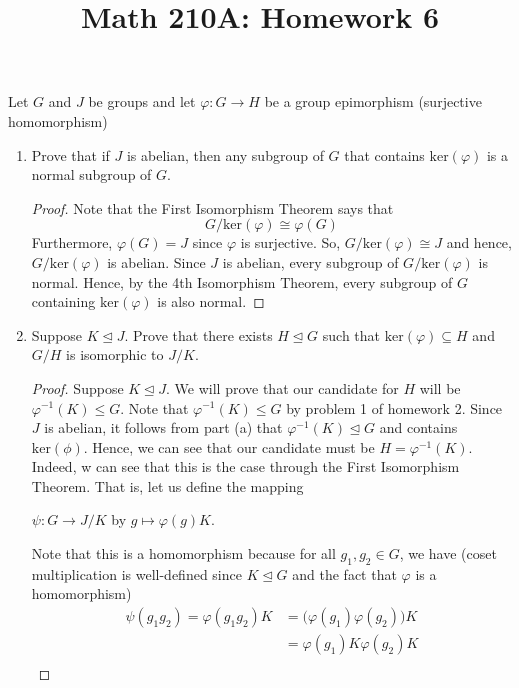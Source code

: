 \documentclass[a4paper]{article}
\title{Math 210A: Homework 6}
\begin{document}
\begin{problem}
    Let \( G  \) and \( J  \) be groups and let \( \varphi : G \to H  \) be a group epimorphism (surjective homomorphism)     
    \begin{enumerate}
        \item[(a)] Prove that if \( J  \) is abelian, then any subgroup of \( G  \) that contains \( \text{ker}(\varphi) \) is a normal subgroup of \( G  \).
            \begin{proof}
Note that the First Isomorphism Theorem says that 
   \[  G / \text{ker}(\varphi)  \cong \varphi(G) \]
   Furthermore, \( \varphi(G) = J  \) since \( \varphi  \) is surjective. So, \( G / \text{ker}(\varphi) \cong J  \) and hence, \( G / \text{ker}(\varphi) \) is abelian. Since \( J  \) is abelian, every subgroup of \( G / \text{ker}(\varphi) \) is normal. Hence, by the 4th Isomorphism Theorem, every subgroup of \( G  \) containing \( \text{ker}(\varphi) \) is also normal.
            \end{proof}
        \item[(b)] Suppose \( K \trianglelefteq J  \). Prove that there exists \( H \trianglelefteq G  \) such that \( \text{ker}(\varphi) \subseteq  H  \) and \( G / H  \) is isomorphic to \( J / K  \).
            \begin{proof}
            Suppose \( K \trianglelefteq J  \). We will prove that our candidate for \( H  \) will be \( \varphi^{-1}(K) \leq  G  \). Note that \( \varphi^{-1}(K) \leq G  \) by problem 1 of homework 2. Since \( J  \) is abelian, it follows from part (a) that \( \varphi^{-1}(K) \trianglelefteq G  \) and contains \( \text{ker}(\phi) \).  
            Hence, we can see that our candidate must be \( H = \varphi^{-1}(K) \). Indeed, 
            w can see that this is the case through the First Isomorphism Theorem. That is, let us define the mapping 
            \begin{center}
            \( \psi : G \to J / K  \) by \( g \mapsto \varphi(g) K   \).
            \end{center}
            Note that this is a homomorphism because for all \( {g}_{1}, {g}_{2} \in G  \), we have  (coset multiplication is well-defined since \( K \trianglelefteq G  \) and the fact that \( \varphi \) is a homomorphism)
            \begin{align*}
                \psi({g}_{1}{g}_{2}) = \varphi({g}_{1}{g}_{2}) K  &= \Big(\varphi({g}_{1}) \varphi({g}_{2}) \Big)  K    \\
                                                                  &= \varphi({g}_{1}) K \varphi({g}_{2}) K  \\

\end{align*}
\end{proof}
\end{enumerate}
\end{problem}
\end{document}
